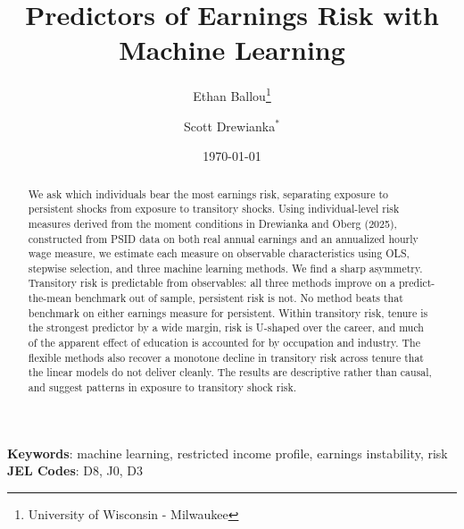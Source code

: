 \documentclass[12pt]{article}
\title{Predictors of Earnings Risk with Machine Learning}
\author{Ethan Ballou\thanks{University of Wisconsin - Milwaukee} \and Scott Drewianka$^{*}$}
\date{\today}
\begin{document}
\maketitle
\thispagestyle{empty}



\begin{abstract}
\begin{singlespace}


\noindent

We ask which individuals bear the most earnings risk, separating exposure to persistent shocks from exposure to transitory shocks. Using individual-level risk measures derived from the moment conditions in Drewianka and Oberg (2025), constructed from PSID data on both real annual earnings and an annualized hourly wage measure, we estimate each measure on observable characteristics using OLS, stepwise selection, and three machine learning methods. We find a sharp asymmetry. Transitory risk is predictable from observables: all three methods improve on a predict-the-mean benchmark out of sample, persistent risk is not. No method beats that benchmark on either earnings measure for persistent. Within transitory risk, tenure is the strongest predictor by a wide margin, risk is U-shaped over the career, and much of the apparent effect of education is accounted for by occupation and industry. The flexible methods also recover a monotone decline in transitory risk across tenure that the linear models do not deliver cleanly. The results are descriptive rather than causal, and suggest patterns in exposure to transitory shock risk.

\end{singlespace}
\end{abstract}


\vspace{1cm}

\noindent

\textbf{Keywords}: machine learning, restricted income profile, earnings instability, risk \\
\indent \textbf{JEL Codes}: D8, J0, D3\\


\clearpage
\setcounter{page}{1}
\end{document}
